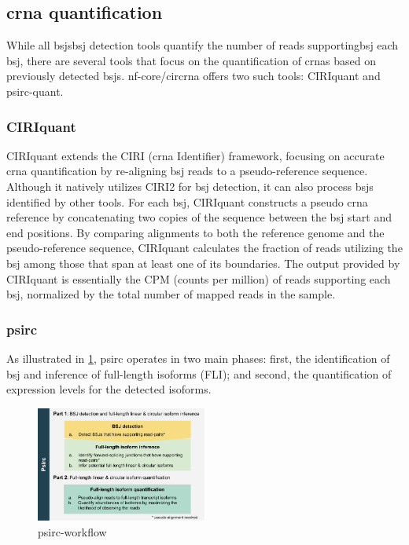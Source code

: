 \subsection{\gls{crna} quantification}
\label{sec:crna_quantification}

While all \gls{bsj}s{bsj} detection tools quantify the number of reads
supporting\gls{bsj} each \gls{bsj}, there are several tools that focus on the
quantification of \gls{crna}s based on previously detected \gls{bsj}s.
nf-core/circrna offers two such tools: CIRIquant and
psirc-quant.

\subsubsection{CIRIquant}
\label{sec:ciriquant}
CIRIquant extends the CIRI (\Gls{crna} Identifier) framework, focusing on
accurate \gls{crna} quantification by re-aligning \gls{bsj} reads to a
pseudo-reference sequence.
Although it natively utilizes CIRI2 for \gls{bsj} detection, it can also
process \gls{bsj}s identified by other tools\supercite{zhang_accurate_2020}.
For each \gls{bsj}, CIRIquant constructs a pseudo \gls{crna} reference by
concatenating two copies of the sequence between the \gls{bsj} start and end
positions.
By comparing alignments to both the reference genome and the pseudo-reference
sequence, CIRIquant calculates the fraction of reads utilizing the \gls{bsj}
among those that span at least one of its
boundaries\supercite{zhang_accurate_2020}.
The output provided by CIRIquant is essentially the CPM (counts per million) of
reads supporting each \gls{bsj}, normalized by the total number of mapped reads
in the sample.

\subsubsection{psirc}
\label{sec:psirc}
As illustrated in \cref{fig:psirc_workflow}, psirc operates in two main phases:
first, the identification of \gls{bsj} and inference of full-length isoforms
(FLI); and second, the quantification of expression levels for the detected
isoforms\supercite{yu_quantifying_2021}.

\begin{figure}[ht] \centering

    \includegraphics[width=0.5\textwidth]{chapters/3_materials_and_methods/figures/psirc_pipeline.png}
    \caption{psirc-workflow} \label{fig:psirc_workflow} \end{figure}

